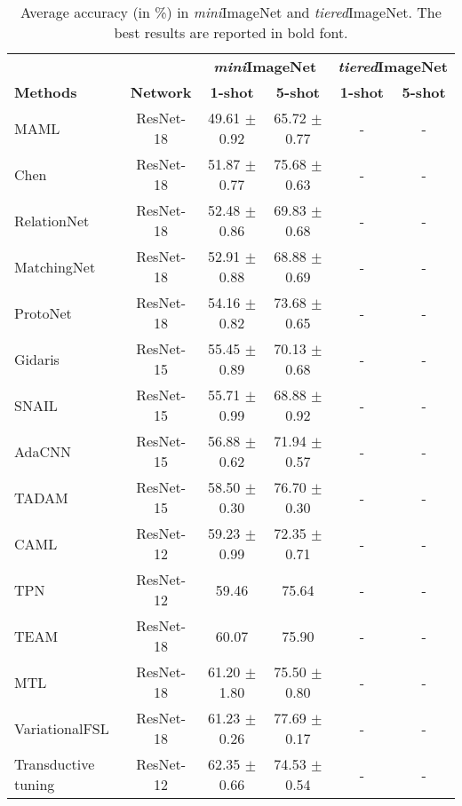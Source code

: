 \documentclass{article}
\begin{document}
\begin{table*}[t]
\caption{Average accuracy (in \%) in \textit{mini}ImageNet and \textit{tiered}ImageNet. The best results are reported in bold font.}
\label{tab:miniimagenet}
\vskip 0.1in
\begin{center}
\begin{small}
\begin{tabular}{lc|cc|cc}
\toprule
& &\multicolumn{2}{c|}{\textbf{\textit{mini}ImageNet}}&\multicolumn{2}{c}{\textbf{\textit{tiered}ImageNet}} \\
\cline{3-6}
\textbf{Methods} & \textbf{Network}&\textbf{1-shot}& \textbf{5-shot}& \textbf{1-shot}& \textbf{5-shot}\\
\hline
MAML \cite{Finn2017ModelAgnosticMF} & ResNet-18 & 49.61 $\pm$ 0.92 & 65.72 $\pm$ 0.77&-&-\\
Chen \cite{chen2018a} & ResNet-18 & 51.87 $\pm$ 0.77 & 75.68 $\pm$ 0.63&-&-\\
RelationNet \cite{sung2018learning} & ResNet-18 & 52.48 $\pm$ 0.86 & 69.83 $\pm$ 0.68&-&-\\
MatchingNet \cite{Vinyals2016MatchingNF} & ResNet-18 & 52.91 $\pm$ 0.88 & 68.88 $\pm$ 0.69&-&-\\
ProtoNet \cite{snell2017prototypical} & ResNet-18 & 54.16 $\pm$ 0.82 & 73.68 $\pm$ 0.65&-&-\\
Gidaris \cite{gidaris2018dynamic}  & ResNet-15 & 55.45 $\pm$ 0.89 & 70.13 $\pm$ 0.68&-&-\\
SNAIL \cite{mishra2018a} & ResNet-15 & 55.71 $\pm$ 0.99 & 68.88 $\pm$ 0.92&-&-\\
AdaCNN \cite{pmlr-v80-munkhdalai18a} & ResNet-15 & 56.88 $\pm$ 0.62 & 71.94 $\pm$ 0.57&-&-\\
TADAM \cite{oreshkin2018tadam}  & ResNet-15 & 58.50 $\pm$ 0.30 & 76.70 $\pm$ 0.30&-&-\\
CAML \cite{jiang2018learning} & ResNet-12 & 59.23 $\pm$ 0.99 & 72.35 $\pm$ 0.71&-&-\\
TPN \cite{liu2018learning} & ResNet-12 & 59.46 & 75.64&-&-\\
TEAM \cite{team}& ResNet-18 & 60.07 & 75.90&-&-\\
MTL \cite{sun2019mtl}  & ResNet-18 & 61.20 $\pm$ 1.80 & 75.50 $\pm$ 0.80&-&-\\
VariationalFSL \cite{Variationalfewshot}  & ResNet-18 & 61.23 $\pm$ 0.26 & 77.69 $\pm$ 0.17&-&-\\
Transductive tuning \cite{Dhillon2020A} & ResNet-12 & 62.35 $\pm$ 0.66 & 74.53 $\pm$ 0.54&-&-\\

\end{tabular}
\end{small}
\end{center}
\end{table*}
\end{document}
